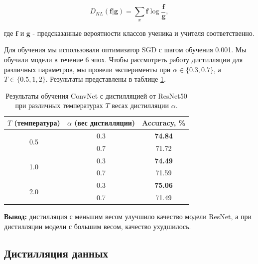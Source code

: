 \documentclass[12pt]{article}
\begin{document}
\begin{equation}\label{eq7}
    D_{KL}(\mathbf{f}|\mathbf{g}) = \sum_{x} \mathbf{f} \log \frac{\mathbf{f}}{\mathbf{g}} ,
\end{equation}

где $\mathbf{f}$ и $\mathbf{g}$ - предсказанные вероятности классов ученика и учителя соответственно.


Для обучения мы использовали оптимизатор SGD с шагом обучения 0.001. Мы обучали модели в течение 6 эпох. Чтобы рассмотреть работу дистилляции для различных параметров, мы провели эксперименты при $\alpha \in \{0.3, 0.7\}$, а $T\in \{0.5, 1, 2\}$.
Результаты представлены в таблице \ref{tab:table_2}.


\begin{table}[]
\begin{center}
\begin{tabular}{c|c|c}
    \hline
    \multirow{1}{*}{$T$ (температура)}& $\alpha$ (вес дистилляции)& Accuracy, \% \\
    \hline
    \multirow{2}{*}{0.5}& 0.3 & \textbf{74.84}\\
    & 0.7 & 71.72\\
    \hline
    \multirow{2}{*}{1.0}& 0.3 & \textbf{74.49}\\
    & 0.7 & 71.59\\
    \hline
    \multirow{2}{*}{2.0}& 0.3 & \textbf{75.06}\\
    & 0.7 & 71.49\\
    \hline
\end{tabular}
\end{center}
\caption{Результаты обучения ConvNet с дистилляцией от ResNet50 при различных температурах $T$ весах дистилляции $\alpha$.}
\label{tab:table_2}
\end{table}

\textbf{Вывод:} дистилляция с меньшим весом улучшило качество модели ResNet, а при дистилляции модели с большим весом, качество ухудшилось.

\subsection{Дистилляция данных}\label{42}
\end{document}
